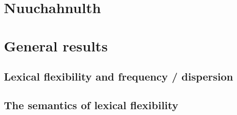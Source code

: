 \section{Nuuchahnulth}
\label{sec:4.4}

\section{General results}
\label{sec:4.5}

\subsection{Lexical flexibility and frequency / dispersion}
\label{sec:4.5.1}

\subsection{The semantics of lexical flexibility}
\label{sec:4.5.2}
